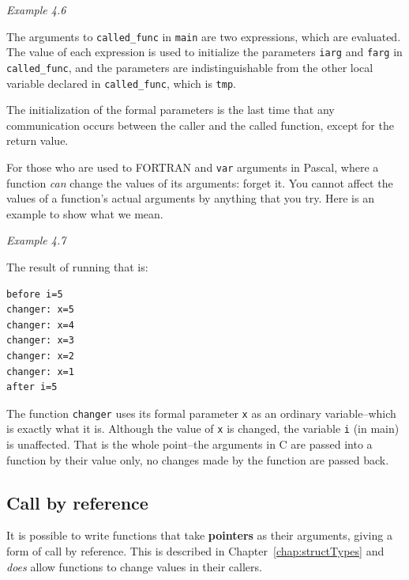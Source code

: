 \begin{center}\textit{Example 4.6}\end{center}

   The arguments to \texttt{called\_func} in \texttt{main} are two
    expressions, which are evaluated. The value of each expression is used
    to initialize the parameters \texttt{iarg} and \texttt{farg} in
    \texttt{called\_func}, and the parameters are indistinguishable from
    the other local variable declared in \texttt{called\_func}, which is
    \texttt{tmp}.


   The initialization of the formal parameters is the last time that any
    communication occurs between the caller and the called function, except
    for the return value.


   For those who are used to FORTRAN and \texttt{var} arguments in
    Pascal, where a function \textit{can} change the values of its
    arguments: forget it. You cannot affect the values of a function's
    actual arguments by anything that you try. Here is an example to show
    what we mean.

\begin{center}\textit{Example 4.7}\end{center}

   The result of running that is:

\begin{Verbatim}
before i=5
changer: x=5
changer: x=4
changer: x=3
changer: x=2
changer: x=1
after i=5
\end{Verbatim}

   The function \texttt{changer} uses its formal parameter
    \texttt{x} as an ordinary variable--which is exactly what it is.
    Although the value of \texttt{x} is changed, the variable
    \texttt{i} (in main) is unaffected. That is the whole point--the
    arguments in C are passed into a function by their value only, no
    changes made by the function are passed back.


  

  \subsection{Call by reference}
   
   It is possible to write functions that take \textbf{pointers} as
    their arguments, giving a form of call by reference. This is described
    in Chapter~\ref{chap:structTypes} and \textit{does} allow functions to change
    values in their callers.

